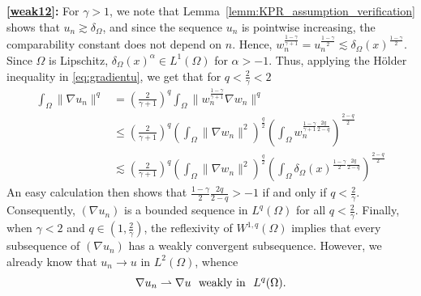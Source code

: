\documentclass[12pt,a4paper]{amsart}
\theoremstyle{definition}
\begin{document}
\textbf{\eqref{weak12}:} For $\gamma > 1$, we note that Lemma~\ref{lemm:KPR_assumption_verification} shows that $u_n \gtrsim \delta_{\Omega}$, and since the sequence $u_n$ is pointwise increasing, the comparability constant does not depend on $n$. Hence, $w_n^{\frac{1-\gamma}{\gamma +1}} = u_n^{\frac{1-\gamma}{2}} \lesssim \delta_{\Omega}(x)^{\frac{1-\gamma}{2}}$. Since $\Omega$ is Lipschitz, $\delta_{\Omega}(x)^{\alpha} \in L^1(\Omega)$ for $\alpha > -1$. Thus, applying the H\"older inequality in \eqref{eq:gradientu}, we get that for $q < \frac{2}{\gamma} < 2$
\begin{equation*}
\begin{split}
    \int_{\Omega} \lVert \nabla u_n \rVert^q &= \left ( \frac{2}{\gamma +1} \right )^q \int_{\Omega} \lVert w_n^{\frac{1-\gamma}{\gamma +1}}\nabla w_n \rVert^q \\
    &\leq \left ( \frac{2}{\gamma +1} \right )^q \left( \int_{\Omega} \lVert \nabla w_n \rVert^2  \right)^{\frac{q}{2}} \left( \int_{\Omega} w_n^{\frac{1-\gamma}{\gamma +1}\frac{2q}{2-q}}  \right)^{\frac{2-q}{2}} \\
    &\lesssim \left ( \frac{2}{\gamma +1} \right )^q \left( \int_{\Omega} \lVert \nabla w_n \rVert^2  \right)^{\frac{q}{2}} \left( \int_{\Omega} \delta_{\Omega}(x)^{\frac{1-\gamma}{2} \frac{2q}{2-q}}  \right)^{\frac{2-q}{2}} 
\end{split}
\end{equation*}
An easy calculation then shows that $\frac{1-\gamma}{2} \frac{2q}{2-q} > -1$ if and only if $q < \frac{2}{\gamma}$. Consequently, $(\nabla u_n)$ is a bounded sequence in $L^q(\Omega)$ for all $q < \frac{2}{\gamma}$. Finally, when $\gamma < 2$ and $q \in (1, \frac{2}{\gamma})$, the reflexivity of $W^{1,q}(\Omega)$ implies that every subsequence of $(\nabla u_n)$ has a weakly convergent subsequence. However, we already know that $u_n \to u$ in $L^{2}(\Omega)$, whence
\begin{equation}\label{slabaqglob}
\nabla u_n\rightharpoonup \nabla u\ \ \hbox{weakly in}\ \  L^q(\Omega).
\end{equation}
\end{document}
